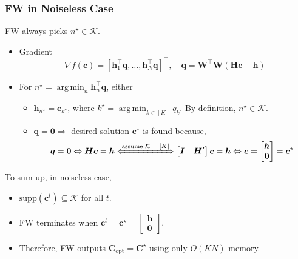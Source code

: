 \documentclass[10pt,xcolor={usenames,dvipsnames,table}]{beamer}
\newcommand{\T}{\!\top\!}
\DeclareMathOperator*{\argmin}{arg\,min}
\begin{document}
\begin{frame}[label=fine]
    \frametitle{FW in Noiseless Case}
    \begin{block}
        
    FW always picks $n^{\star} \in \mathcal{K}$.
    \end{block}
    \begin{itemize}
        \item Gradient
    \begin{equation*}
        \nabla f(\mathbf{c}) 
        = [\bm{h}_1^{\T}\bm{q}, \ldots , \bm{h}_N^{\T}\bm{q}]^{\T}, \quad \bm{q} = \bm{W}^{\T}\bm{W}(\bm{H}\bm{c}-\bm{h})
    \end{equation*}
    \item For $n^{\star} = \argmin_{n} \bm{h}_n^{\T}\bm{q}$, either
    \begin{itemize}
        \item $\bm{h}_{n^{\star}} = \bm{e}_{k^{\star}}$, where $k^{\star} = \argmin_{k \in [K]} q_k$. By definition, $n^{\star} \in \mathcal{K}$.
        \item $\bm{q} = \bm{0} \Rightarrow$ desired solution $\bm{c}^{\star}$  is found because, 
            \[
            \bm{q} = \bm{0} \Leftrightarrow
            \bm{H}\bm{c} = \bm{h} 
            \xLeftrightarrow{\text{assume $\mathcal{K}=[K]$}}
            \begin{bmatrix}
                \bm{I} & \bm{H}'
            \end{bmatrix}  \bm{c} = \bm{h}
            \Leftrightarrow 
            \bm{c} = \begin{bmatrix}
            \bm{h} \\ \bm{0}
            \end{bmatrix} =\bm{c}^{\star}
            \] 
    \end{itemize}
    \end{itemize}

    To sum up, in noiseless case,
    \begin{itemize}
        \item $\text{supp}(\bm{c}^{t}) \subseteq \mathcal{K}$ for all $t$.
        \item FW terminates when $\bm{c}^{t} = \bm{c}^{\star} = \begin{bmatrix}
        \bm{h} \\ \bm{0}
        \end{bmatrix}$.
    \item Therefore, FW outputs $\bm{C}_{\text{opt}} = \bm{C}^{\star}$ using only $O(KN)$ memory.
    \end{itemize}
\end{frame}
\end{document}
